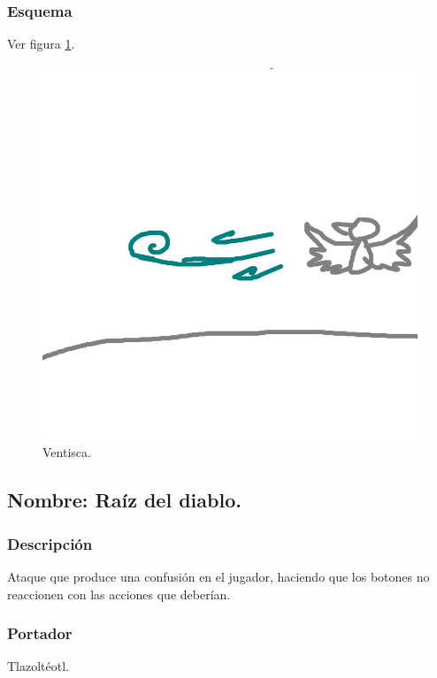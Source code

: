\documentclass[11pt,letterpaper]{article}
\begin{document}
\subsubsection{Esquema}
			Ver figura \ref{fig:ventisca}.
			\begin{figure}
				\centering
				\includegraphics[height=0.2 \textheight]{Imagenes/ventisca}
				\caption{Ventisca.}
				\label{fig:ventisca}
			\end{figure}
\subsection{Nombre: Raíz del diablo.}
\subsubsection{Descripción}
Ataque que produce una confusión en el jugador, haciendo que los botones no reaccionen con las acciones que deberían.
\subsubsection{Portador}
Tlazoltéotl.
\end{document}
